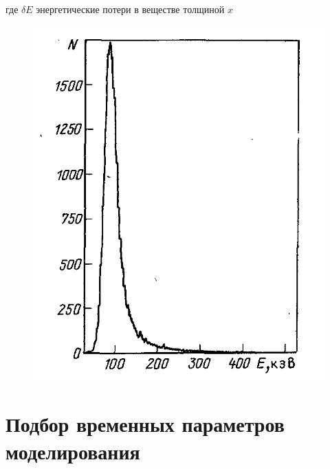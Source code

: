 где $ \delta E $ энергетические потери в веществе толщиной $ x $


\begin{figure}
\centering
\includegraphics[width=0.7\linewidth]{images/landau}
\caption{}
\label{fig:landau}
\end{figure}






\section{Подбор временных параметров моделирования}


